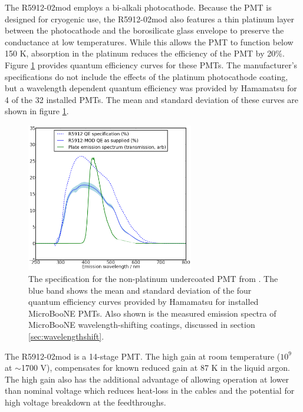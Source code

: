 The R5912-02mod employs a bi-alkali photocathode.  Because the PMT is designed for cryogenic use, the R5912-02mod also features a thin platinum layer between the photocathode and the borosilicate glass envelope to preserve the conductance at low temperatures.   While this allows the PMT to function below 150 K, absorption in the platinum reduces the efficiency of the PMT by 20\%.
Figure \ref{fig:TPBSpectraPlate} provides quantum efficiency curves for these PMTs. The manufacturer's specifications do not include the effects of the platinum photocathode coating, but a wavelength dependent quantum efficiency was provided by Hamamatsu for 4 of the 32 installed PMTs.  The mean and standard deviation of these curves are shown in figure \ref{fig:TPBSpectraPlate}. 

\begin{figure}
\centering 
\includegraphics[width=0.65\textwidth]{./figures/PlateSpectra.png}
\caption{The specification for the non-platinum undercoated PMT from \cite{Hamamatsu-Datasheet8inch}.  The blue band shows the mean and standard deviation of the four quantum efficiency curves provided by Hamamatsu for installed MicroBooNE PMTs. Also shown is the measured emission spectra of MicroBooNE wavelength-shifting coatings, discussed in section \ref{sec:wavelengthshift}.  \cite{Jones:2015bya}
 \label{fig:TPBSpectraPlate}  }
\end{figure}


The  R5912-02mod is a 14-stage PMT.
The high gain at room temperature ($10^9$ at $\sim$1700 V), compensates for known reduced gain at 87 K in the liquid argon.  
The high gain also has the additional advantage of allowing operation at lower than nominal voltage which reduces heat-loss in the cables and the potential for high voltage breakdown at the feedthroughs.




